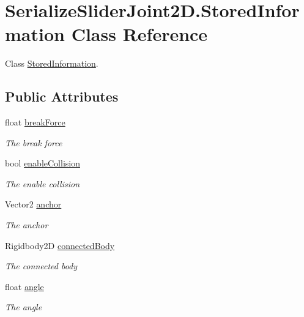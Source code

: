 \hypertarget{class_serialize_slider_joint2_d_1_1_stored_information}{}\section{Serialize\+Slider\+Joint2\+D.\+Stored\+Information Class Reference}
\label{class_serialize_slider_joint2_d_1_1_stored_information}


Class \hyperlink{class_serialize_slider_joint2_d_1_1_stored_information}{Stored\+Information}.  


\subsection*{Public Attributes}
\begin{DoxyCompactItemize}
\item 
float \hyperlink{class_serialize_slider_joint2_d_1_1_stored_information_a2650e454475185f742bbf3c788aab7e7}{break\+Force}
\begin{DoxyCompactList}\small\item\em The break force \end{DoxyCompactList}\item 
bool \hyperlink{class_serialize_slider_joint2_d_1_1_stored_information_aa473c6cdd6671257dbf03e6638004d1b}{enable\+Collision}
\begin{DoxyCompactList}\small\item\em The enable collision \end{DoxyCompactList}\item 
Vector2 \hyperlink{class_serialize_slider_joint2_d_1_1_stored_information_aaccd9811fadff58f2e64e813fe118e09}{anchor}
\begin{DoxyCompactList}\small\item\em The anchor \end{DoxyCompactList}\item 
Rigidbody2D \hyperlink{class_serialize_slider_joint2_d_1_1_stored_information_a85d41c4bf6d2c3ed5906c2ccd43974c4}{connected\+Body}
\begin{DoxyCompactList}\small\item\em The connected body \end{DoxyCompactList}\item 
float \hyperlink{class_serialize_slider_joint2_d_1_1_stored_information_a4cf92e1631bca416b0641d661c431694}{angle}
\begin{DoxyCompactList}\small\item\em The angle \end{DoxyCompactList}\item 

\end{DoxyCompactItemize}
